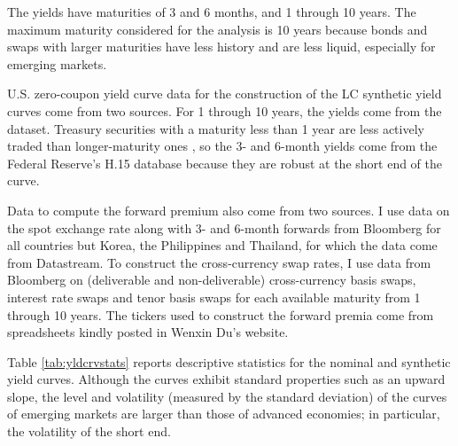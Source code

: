 \documentclass[a4paper, 12pt]{article}
\begin{document}
The yields have maturities of 3 and 6 months, and 1 through 10 years. The maximum maturity considered for the analysis is 10 years because bonds and swaps with larger maturities have less history and are less liquid, especially for emerging markets. 

U.S. zero-coupon yield curve data for the construction of the LC synthetic yield curves come from two sources. For 1 through 10 years, the yields come from the \cite{GSW:2007} dataset. Treasury securities with a  maturity less than 1 year are less actively traded than longer-maturity ones \citep{Duffee:2010}, so the 3- and 6-month yields come from the Federal Reserve's H.15 database because they are robust at the short end of the curve. 

Data to compute the forward premium also come from two sources. I use data on the spot exchange rate along with 3- and 6-month forwards from Bloomberg for all countries but Korea, the Philippines and Thailand, for which the data come from Datastream. To construct the cross-currency swap rates, I use data from Bloomberg on (deliverable and non-deliverable) cross-currency basis swaps, interest rate swaps and tenor basis swaps for each available maturity from 1 through 10 years. The tickers used to construct the forward premia come from spreadsheets kindly posted in Wenxin Du's website. 

Table \ref{tab:yldcrvstats} reports descriptive statistics for the nominal and synthetic yield curves. Although the curves exhibit standard properties such as an upward slope, the level and volatility (measured by the standard deviation) of the curves of emerging markets are larger than those of advanced economies; in particular, the volatility of the short end. 
\end{document}
